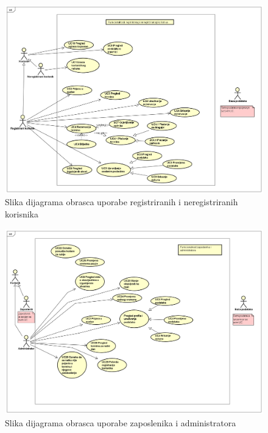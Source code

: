\begin{figure}[H]
	\includegraphics[width=.9\linewidth]{slike/DOU1.PNG}
	\centering
	\caption{Slika dijagrama obrasca uporabe registriranih i neregistriranih korisnika}
	\label{fig:dou1}
\end{figure}

\begin{figure}[H]
	\includegraphics[width=.9\linewidth]{slike/DOU2.PNG}
	\centering
	\caption{Slika dijagrama obrasca uporabe zaposlenika i administratora}
	\label{fig:dou2}
\end{figure}

